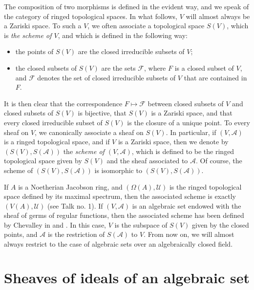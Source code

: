 \documentclass[british]{article}
\providecommand{\tightlist}{%
\setlength{\itemsep}{0pt}\setlength{\parskip}{0pt}}
\newcommand{\oldpage}[1]{\marginpar{\footnotesize$\Big\vert$ \textit{p.~#1}}}
\begin{document}
The composition of two morphisms is defined in the evident way, and we
speak of the category of ringed topological spaces. In what follows,
\(V\) will almost always be a Zariski space. To such a \(V\), we often
associate a topological space \(S(V)\), which is \emph{the scheme of
\(V\)}, and which is defined in the following way:

\begin{itemize}
\tightlist
\item
  the points of \(S(V)\) are the closed irreducible subsets of \(V\);
\item
  the closed subsets of \(S(V)\) are the sets \({\mathscr{F}}\), where
  \(F\) is a closed subset of \(V\), and \({\mathscr{F}}\) denotes the
  set of closed irreducible subsets of \(V\) that are contained in
  \(F\).
\end{itemize}

It is then clear that the correspondence \(F\mapsto{\mathscr{F}}\)
between closed subsets of \(V\) and closed subsets of \(S(V)\) is
bijective, that \(S(V)\) is a Zariski space, and that every closed
irreducible subset of \(S(V)\) is the closure of a unique point. To
every sheaf on \(V\), we canonically associate a sheaf on \(S(V)\). In
particular, if \((V,{\mathscr{A}})\) is a ringed topological space, and
if \(V\) is a Zariski space, then we denote by
\((S(V),S({\mathscr{A}}))\) the \emph{scheme of \((V,{\mathscr{A}})\)},
which is defined to be the ringed topological space given by \(S(V)\)
and the sheaf associated to \({\mathscr{A}}\). \oldpage{2-02} Of course,
the scheme of \((S(V),S({\mathscr{A}}))\) is isomorphic to
\((S(V),S({\mathscr{A}}))\).

If \(A\) is a Noetherian Jacobson ring, and
\((\Omega(A),{\mathscr{U}})\) is the ringed topological space defined by
its maximal spectrum, then the associated scheme is exactly
\((V(A),{\mathscr{U}})\) (see Talk no. 1). If \((V,{\mathscr{A}})\) is
an algebraic set endowed with the sheaf of germs of regular functions,
then the associated scheme has been defined by Chevalley in \autocite{3}
and \autocite{4}. In this case, \(V\) is the subspace of \(S(V)\) given
by the closed points, and \({\mathscr{A}}\) is the restriction of
\(S({\mathscr{A}})\) to \(V\). From now on, we will almost always
restrict to the case of algebraic sets over an algebraically closed
field.

\section{Sheaves of ideals of an algebraic set}\label{section-2}
\end{document}
